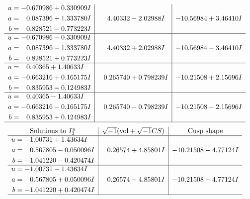 \documentclass[1p]{elsarticle_modified}
\theoremstyle{definition}
\newcommand{\I}{\sqrt{-1}}
\begin{document}
$$\begin{array}{c|c|c}
\begin{aligned}
u &= -0.670986 + 0.330909 I \\
a &= \phantom{-}0.087396 + 1.333780 I \\
b &= \phantom{-}0.828521 - 0.773223 I\end{aligned}
 & \phantom{-}4.40332 - 2.02988 I & -10.56984 + 3.46410 I \\ \hline\begin{aligned}
u &= -0.670986 - 0.330909 I \\
a &= \phantom{-}0.087396 - 1.333780 I \\
b &= \phantom{-}0.828521 + 0.773223 I\end{aligned}
 & \phantom{-}4.40332 + 2.02988 I & -10.56984 - 3.46410 I \\ \hline\begin{aligned}
u &= \phantom{-}0.40365 + 1.40633 I \\
a &= -0.663216 + 0.165175 I \\
b &= \phantom{-}0.835953 - 0.124983 I\end{aligned}
 & \phantom{-}0.265740 + 0.798239 I & -10.21508 + 2.15696 I \\ \hline\begin{aligned}
u &= \phantom{-}0.40365 - 1.40633 I \\
a &= -0.663216 - 0.165175 I \\
b &= \phantom{-}0.835953 + 0.124983 I\end{aligned}
 & \phantom{-}0.265740 - 0.798239 I & -10.21508 - 2.15696 I\\
 \hline 
 \end{array}$$\newpage$$\begin{array}{c|c|c}  
\text{Solutions to }I^u_{3}& \I (\text{vol} + \sqrt{-1}CS) & \text{Cusp shape}\\
 \hline 
\begin{aligned}
u &= -1.00731 + 1.43634 I \\
a &= \phantom{-}0.567805 - 0.050096 I \\
b &= -1.041220 - 0.420474 I\end{aligned}
 & \phantom{-}0.26574 + 4.85801 I & -10.21508 - 4.77124 I \\ \hline\begin{aligned}
u &= -1.00731 - 1.43634 I \\
a &= \phantom{-}0.567805 + 0.050096 I \\
b &= -1.041220 + 0.420474 I\end{aligned}
 & \phantom{-}0.26574 - 4.85801 I & -10.21508 + 4.77124 I\\
 \hline 
 \end{array}$$\newpage\newpage\renewcommand{\arraystretch}{1}
\end{document}
